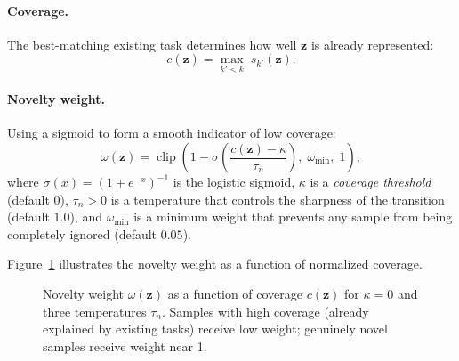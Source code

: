 \documentclass[12pt,a4paper]{article}
\begin{document}
\paragraph{Coverage.}
The best-matching existing task determines how well $\mathbf{z}$ is already represented:
\begin{equation}
    c(\mathbf{z}) = \max_{k' < k}\; s_{k'}(\mathbf{z}).
    \label{eq:coverage}
\end{equation}

\paragraph{Novelty weight.}
Using a sigmoid to form a smooth indicator of low coverage:
\begin{equation}
    \omega(\mathbf{z}) = \operatorname{clip}\!\left(1 - \sigma\!\left(\frac{c(\mathbf{z}) - \kappa}{\tau_n}\right),\; \omega_{\min},\; 1\right),
    \label{eq:novelty}
\end{equation}
where $\sigma(x) = (1+e^{-x})^{-1}$ is the logistic sigmoid, $\kappa$ is a \emph{coverage threshold} (default $0$), $\tau_n > 0$ is a temperature that controls the sharpness of the transition (default $1.0$), and $\omega_{\min}$ is a minimum weight that prevents any sample from being completely ignored (default $0.05$).

Figure~\ref{fig:novelty} illustrates the novelty weight as a function of normalized coverage.

\begin{figure}[t]
\centering
{}
\caption{Novelty weight $\omega(\mathbf{z})$ as a function of coverage $c(\mathbf{z})$ for $\kappa=0$ and three temperatures $\tau_n$. Samples with high coverage (already explained by existing tasks) receive low weight; genuinely novel samples receive weight near 1.}
\label{fig:novelty}
\end{figure}
\end{document}
